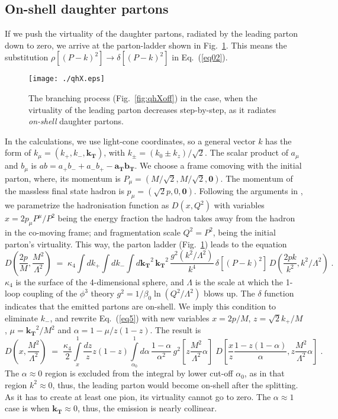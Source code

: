 \documentclass{PoS}
\newcommand{\be}{\begin{equation}}
\newcommand{\ee}[1]{\label{#1} \end{equation}}
\begin{document}
\subsection{On-shell daughter partons}
If we push the virtuality of the daughter partons, radiated by the leading parton down to zero, we arrive at the parton-ladder shown in Fig.~\ref{fig:qhX}. This means the substitution $\rho\left[(P-k)^2\right] \rightarrow \delta\left[(P-k)^2\right]$ in Eq.~(\ref{eq02}).  
\begin{figure}[h]
\begin{center}
\texttt{[image: ./qhX.eps]} %
\end{center}
\caption{The branching process (Fig.~\ref{fig:qhXoff}) in the case, when the virtuality of the leading parton decreases step-by-step, as it radiates \textit{on-shell} daughter partons.
\label{fig:qhX}}
\end{figure}
In the calculations, we use light-cone coordinates, so a general vector $k$ has the form of $k_\mu = (k_+ , k_-,\mathbf{k_T})$, with $k_\pm = (k_0\pm k_z)/\sqrt 2$. The scalar product of $a_\mu$ and $b_\mu$ is $ab = a_+b_- + a_-b_+ - \mathbf{a_T}\mathbf{b_T}$. We choose a frame comoving with the initial parton, where, its momentum is $P_\mu = (M/\sqrt 2,M/\sqrt 2,\mathbf{0} )$. The momentum of the massless final state hadron is $p_\mu = (\sqrt{2}p,0,\mathbf{0})$. Following the arguments in \cite{bib:UKFF}, we parametrize the hadronisation function as $D\left(x, Q^2 \right)$ with variables $x = 2p_\mu P^\mu / P^2$ being the energy fraction the hadron takes away from the hadron in the co-moving frame; and fragmentation scale $Q^2 = P^2$, being the initial parton's virtuality. This way, the parton ladder (Fig.~\ref{fig:qhX}) leads to the equation
\be
D\left(\frac{2p}{M}, \frac{M^2}{\Lambda^2}\right) \;=\; \kappa_4\int dk_+ \int dk_- \int d\mathbf{k_T}^2\,\mathbf{k_T}^2\, \frac{g^2(k^2 / \Lambda^2)}{k^4} \,\delta\left[(P-k)^2\right] \, D\left(\frac{2pk}{k^2}, k^2 / \Lambda^2 \right) \;.
\ee{eq5}
$\kappa_4$ is the surface of the 4-dimensional sphere, and $\Lambda$ is the scale at which the 1-loop coupling of the $\phi^3$ theory $g^2 = 1/\beta_0 \ln(Q^2/\Lambda^2)$ blows up. The $\delta$ function indicates that the emitted partons are on-shell. We imply this condition to eliminate $k_-$, and rewrite Eq.~(\ref{eq5}) with new variables $x = 2p/M$, $z = \sqrt{2}k_+/M$, $\mu = \mathbf{k_T}^2/M^2$ and $\alpha = 1- \mu/z(1-z)$. The result is
\be
D\left(x, \frac{M^2}{\Lambda^2}\right) \;=\; \frac{\kappa_4}{2} \int\limits_x^1 \frac{dz}{z} z(1-z) \int\limits_{\alpha_0}^1 d\alpha \, \frac{1-\alpha}{\alpha^2} \, g^2\left[z\frac{M^2}{\Lambda^2} \alpha \right] \; D\left[\frac{x}{z} \frac{1 - z(1-\alpha)}{\alpha}, z\frac{M^2}{\Lambda^2} \alpha \right] \;.
\ee{eq6}
The $\alpha\approx0$ region is excluded from the integral by lower cut-off $\alpha_0$, as in that region $k^2\approx0$, thus, the leading parton would become on-shell after the splitting. As it has to create at least one pion, its virtuality cannot go to zero. The $\alpha\approx1$ case is when $\mathbf{k_T}\approx0$, thus, the emission is nearly collinear.  
\end{document}
